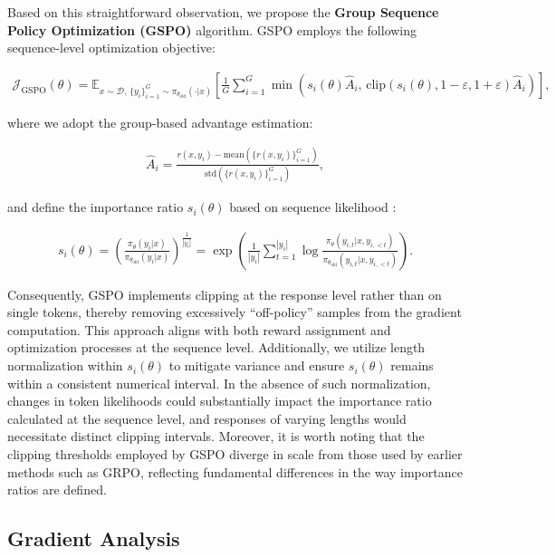 Based on this straightforward observation, we propose the \textbf{Group Sequence Policy Optimization (GSPO)} algorithm. GSPO employs the following sequence-level optimization objective:

\begin{align}
\mathcal{J}_\text{GSPO} (\theta) =
\mathbb{E}_{ x \sim \mathcal{D},\, \{y_i\}_{i=1}^G \sim \pi_{\theta_\text{old}}( \cdot | x) }
\left[ 
\frac{1}{G} \sum_{i=1}^{G}
\min \left( s_{i}(\theta)  \widehat{A}_{i},  \, \mathrm{clip} \left( s_{i}(\theta), 1 - {\varepsilon}, 1 + {\varepsilon} \right) \widehat{A}_{i} \right) 
\right],
\label{equ:gspo}
\end{align}

where we adopt the group-based advantage estimation:

\begin{align}
\widehat{A}_{i} = \frac{r(x, y_i) - \mathrm{mean} \left( \{ r(x, y_i) \}_{i=1}^G \right) }{ \mathrm{std} \left( \{ r(x, y_i) \}_{i=1}^G \right) },
\end{align}

and define the importance ratio $s_{i}(\theta)$ based on sequence likelihood \citep{click}:

\begin{align}
s_{i}(\theta) = \left( \frac{ \pi_{\theta} (y_i | x) }{ \pi_{\theta_\text{old}} (y_i | x)} \right)^{\frac{1}{|y_i|}}
=
\exp \left( \frac{1}{|y_i|} \sum_{t=1}^{|y_i|} \log \frac{ \pi_{\theta} (y_{i,t} | x, y_{i,<t}) }{ \pi_{\theta_\text{old}} (y_{i,t} | x,y_{i,<t})} \right).
\end{align}

Consequently, GSPO implements clipping at the response level rather than on single tokens, thereby removing excessively ``off-policy'' samples from the gradient computation. This approach aligns with both reward assignment and optimization processes at the sequence level. Additionally, we utilize length normalization within $s_{i}(\theta)$ to mitigate variance and ensure $s_{i}(\theta)$ remains within a consistent numerical interval. In the absence of such normalization, changes in token likelihoods could substantially impact the importance ratio calculated at the sequence level, and responses of varying lengths would necessitate distinct clipping intervals. Moreover, it is worth noting that the clipping thresholds employed by GSPO diverge in scale from those used by earlier methods such as GRPO, reflecting fundamental differences in the way importance ratios are defined.

\subsection{Gradient Analysis}
\label{subsec:gradient}

